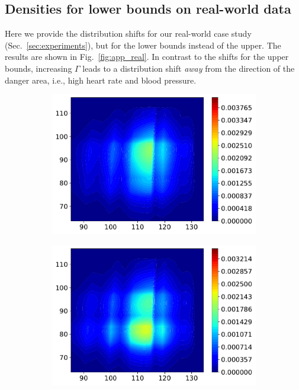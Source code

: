 \documentclass{article} %
\theoremstyle{definition}
\theoremstyle{plain}
\begin{document}
\subsection{Densities for lower bounds on real-world data}

Here we provide the distribution shifts for our real-world case study (Sec.~\ref{sec:experiments}), but for the lower bounds instead of the upper. The results are shown in Fig.~\ref{fig:app_real}. In contrast to the shifts for the upper bounds, increasing $\Gamma$ leads to a distribution shift \emph{away} from the direction of the danger area, i.e., high heart rate and blood pressure. 

\begin{figure}[ht]
 \centering
\begin{subfigure}{0.30\textwidth}
  \centering
  \includegraphics[width=1\linewidth]{figures/plot_real_stage1.pdf}
\end{subfigure}%
\begin{subfigure}{0.30\textwidth}
  \centering
  \includegraphics[width=1\linewidth]{figures/plot_real_stage2_lower_gamma2.pdf}

\end{subfigure}
\end{figure}
\end{document}
